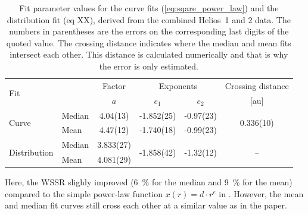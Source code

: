 \begin{table}
	\caption{Fit parameter values for the curve fits (\autoref{eq:sqare_power_law}) and the distribution fit (eq XX), derived from the combined Helios~1 and 2 data. The numbers in parentheses are the errors on the corresponding last digits of the quoted value. The crossing distance indicates where the median and mean fits intersect each other. This distance is calculated numerically and that is why the error is only estimated.}
	\label{tab:bfield_fit_parameters}
	\centering
	\begin{tabular}{l l c c c c}
		\hline\hline
		\multirow{2}{*}{Fit}	&	&Factor	&\multicolumn{2}{c}{Exponents}	&Crossing distance\\
		\cline{4-5}
			&	&$a$	&$e_1$	&$e_2$	&[au]\\
		\hline
		\multirow{2}{*}{Curve}	&Median	&4.04(13)	&-1.852(25)	&-0.97(23)	&\multirow{2}{*}{0.336(10)}\\
			&Mean	&4.47(12)	&-1.740(18)	&-0.99(23)	&\\
		\multirow{2}{*}{Distribution}	&Median	&3.833(27)	&\multirow{2}{*}{-1.858(42)}	&\multirow{2}{*}{-1.32(12)}	&\multirow{2}{*}{--}\\
			&Mean	&4.081(29)	&	&	&\\
		\hline
	\end{tabular}
\end{table}
%

Here, the WSSR slighly improved (\SI{6}{\%} for the median and \SI{9}{\%} for the mean) compared to the simple power-law function $x(r) = d \cdot r^e$ in \citet{Venzmer2017}. However, the mean and median fit curves still cross each other at a similar value as in the paper.\\

